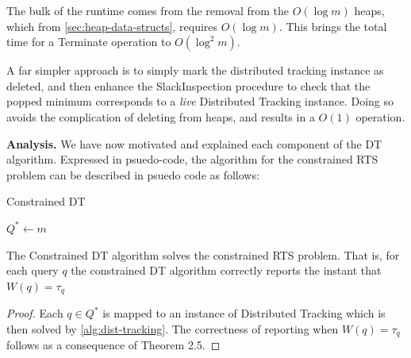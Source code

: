 The bulk of the runtime comes from the removal from the $O(\log m)$ heaps, which from \cref{sec:heap-data-structs}, requires $O(\log m)$. This brings the total time for a Terminate operation to $O(\log ^2 m)$.

A far simpler approach is to simply mark the distributed tracking instance as deleted, and then enhance the SlackInspection procedure to check that the popped minimum corresponds to a \textit{live} Distributed Tracking instance. Doing so avoids the complication of deleting from heaps, and results in a $O(1)$ operation.

\textbf{Analysis.} We have now motivated and explained each component of the DT algorithm. Expressed in psuedo-code, the algorithm for the constrained RTS problem can be described in psuedo code as follows:

\begin{algorithm}
\caption{Constrained DT}\label{alg:constrained-dt}
\begin{algorithmic}[1]
\Require $Q^* \gets m$ 
\State {}
    \State {}
    \State {}
\EndFor
\State {} 
\State {}
\State {}
\State {}
\State {}
\EndFor
\end{algorithmic}
\end{algorithm}

\begin{theorem}[Correctness] The Constrained DT algorithm solves the constrained RTS problem. That is, for each query $q$ the constrained DT algorithm correctly reports the instant that $W(q) = \tau_q$
\end{theorem}
\begin{proof}
    Each $q \in Q^*$ is mapped to an instance of Distributed Tracking which is then solved by \cref{alg:dist-tracking}. The correctness of reporting when $W(q) = \tau_q$ follows as a consequence of Theorem 2.5.
\end{proof}

